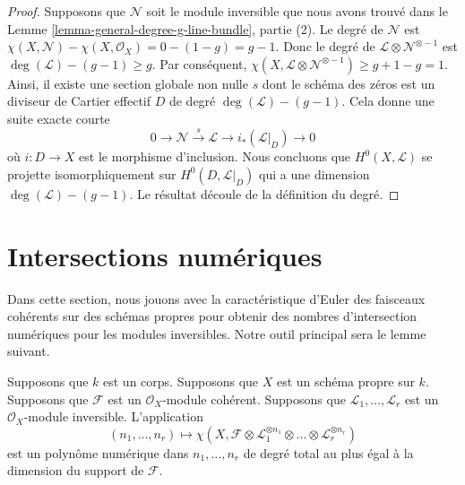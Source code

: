 \begin{proof}
Supposons que $\mathcal{N}$ soit le module inversible que
nous avons trouvé dans le Lemme
\ref{lemma-general-degree-g-line-bundle}, partie (2). Le
degré de $\mathcal{N}$ est $\chi(X, \mathcal{N}) - \chi(X,
\mathcal{O}_X) = 0 - (1 - g) = g - 1$. Donc le degré de
$\mathcal{L} \otimes \mathcal{N}^{\otimes - 1}$ est
$\deg(\mathcal{L}) - (g - 1) \geq g$. Par conséquent, $\chi(X,
\mathcal{L} \otimes \mathcal{N}^{\otimes -1}) \geq g + 1 - g =
1$. Ainsi, il existe une section globale non nulle $s$ dont le
schéma des zéros est un diviseur de Cartier effectif $D$ de degré
$\deg(\mathcal{L}) - (g - 1)$. Cela donne une suite exacte courte
$$
0 \to \mathcal{N} \xrightarrow{s} \mathcal{L} \to i_*(\mathcal{L}|_D) \to 0
$$
où $i : D \to X$ est le morphisme d'inclusion. Nous concluons
que $H^0(X, \mathcal{L})$ se projette isomorphiquement sur
$H^0(D, \mathcal{L}|_D)$ qui a une dimension
$\deg(\mathcal{L}) - (g - 1)$. Le résultat découle de la définition du degré.
\end{proof}






\section{Intersections numériques}
\label{section-num}

\noindent
Dans cette section, nous jouons avec la caractéristique
d'Euler des faisceaux cohérents sur des schémas propres pour
obtenir des nombres d'intersection numériques pour les
modules inversibles. Notre outil principal sera le lemme suivant.

\begin{lemma}
\label{lemma-numerical-polynomial-from-euler}
Supposons que $k$ est un corps. Supposons que $X$ est un schéma
propre sur $k$. Supposons que $\mathcal{F}$ est un
$\mathcal{O}_X$-module cohérent. Supposons que $\mathcal{L}_1, \ldots,
\mathcal{L}_r$ est un $\mathcal{O}_X$-module inversible. L'application
$$
(n_1, \ldots, n_r) \longmapsto
\chi(X, \mathcal{F} \otimes
\mathcal{L}_1^{\otimes n_1} \otimes \ldots \otimes
\mathcal{L}_r^{\otimes n_r})
$$
est un polynôme numérique dans $n_1, \ldots, n_r$ de degré
total au plus égal à la dimension du support de $\mathcal{F}$.
\end{lemma}

